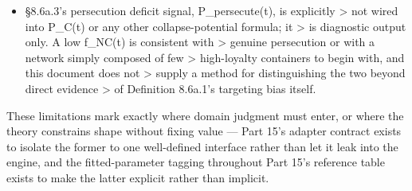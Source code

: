 \documentclass[
]{article}
\begin{document}
\begin{itemize}
  indulged medium-entropy \textgreater{} convergence costs a container
  structurally rather than materially \textgreater{} --- which this
  document does not yet have evidence for beyond the \textgreater{}
  parallel construction argument given at its introduction.
\item
  §8.6a.3's persecution deficit signal, P\_persecute(t), is explicitly
  \textgreater{} not wired into P\_C(t) or any other collapse-potential
  formula; it \textgreater{} is diagnostic output only. A low f\_NC(t)
  is consistent with \textgreater{} genuine persecution or with a
  network simply composed of few \textgreater{} high-loyalty containers
  to begin with, and this document does not \textgreater{} supply a
  method for distinguishing the two beyond direct evidence
  \textgreater{} of Definition 8.6a.1's targeting bias itself.
\end{itemize}

These limitations mark exactly where domain judgment must enter, or
where the theory constrains shape without fixing value --- Part 15's
adapter contract exists to isolate the former to one well-defined
interface rather than let it leak into the engine, and the
fitted-parameter tagging throughout Part 15's reference table exists to
make the latter explicit rather than implicit.
\end{document}
